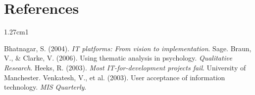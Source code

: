 \documentclass[11pt,a4paper]{article}
\begin{document}
\section{References}

\vspace{0.2cm}
\small\setlength{\parindent}{0pt}\singlespacing
\begin{hangparas}{1.27cm}{1}

Bhatnagar, S. (2004). \textit{IT platforms: From vision to implementation}. Sage.
Braun, V., \& Clarke, V. (2006). Using thematic analysis in psychology. \textit{Qualitative Research}.
Heeks, R. (2003). \textit{Most IT-for-development projects fail}. University of Manchester.
Venkatesh, V., et al. (2003). User acceptance of information technology. \textit{MIS Quarterly}.

\end{hangparas}
\end{document}
